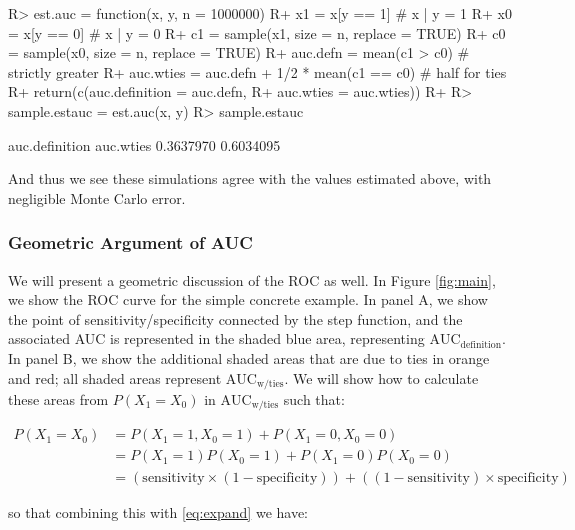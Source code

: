 \documentclass[article]{jss}
\begin{document}
\begin{CodeChunk}

\begin{CodeInput}
R> est.auc = function(x, y, n = 1000000) {
R+   x1 = x[y == 1] # x | y = 1
R+   x0 = x[y == 0] # x | y = 0
R+   c1 = sample(x1, size = n, replace = TRUE)
R+   c0 = sample(x0, size = n, replace = TRUE)
R+   auc.defn = mean(c1 > c0) # strictly greater
R+   auc.wties = auc.defn + 1/2 * mean(c1 == c0) # half for ties
R+   return(c(auc.definition = auc.defn,
R+            auc.wties = auc.wties))
R+ }
R> sample.estauc = est.auc(x, y)
R> sample.estauc
\end{CodeInput}

\begin{CodeOutput}
auc.definition      auc.wties 
     0.3637970      0.6034095 
\end{CodeOutput}
\end{CodeChunk}

And thus we see these simulations agree with the values estimated above,
with negligible Monte Carlo error.

\hypertarget{geometric-argument-of-auc}{%
\subsubsection{Geometric Argument of
AUC}\label{geometric-argument-of-auc}}

We will present a geometric discussion of the ROC as well. In Figure
\ref{fig:main}, we show the ROC curve for the simple concrete example.
In panel A, we show the point of sensitivity/specificity connected by
the step function, and the associated AUC is represented in the shaded
blue area, representing \(\text{AUC}_{\text{definition}}\). In panel B,
we show the additional shaded areas that are due to ties in orange and
red; all shaded areas represent \(\text{AUC}_{\text{w/ties}}\). We will
show how to calculate these areas from \(P(X_{1} = X_{0})\) in
\(\text{AUC}_{\text{w/ties}}\) such that:

\begin{align*}
P(X_{1} = X_{0}) &= P(X_{1} = 1, X_{0} = 1) + P(X_{1} = 0, X_{0} = 0) \\
&= P(X_{1} = 1) P(X_{0} = 1) + P(X_{1} = 0) P(X_{0} = 0) \\
&= \left(\text{sensitivity} \times (1 - \text{specificity})\right) + \left((1- \text{sensitivity}) \times \text{specificity}\right)
\end{align*}

so that combining this with \eqref{eq:expand} we have:
\end{document}
